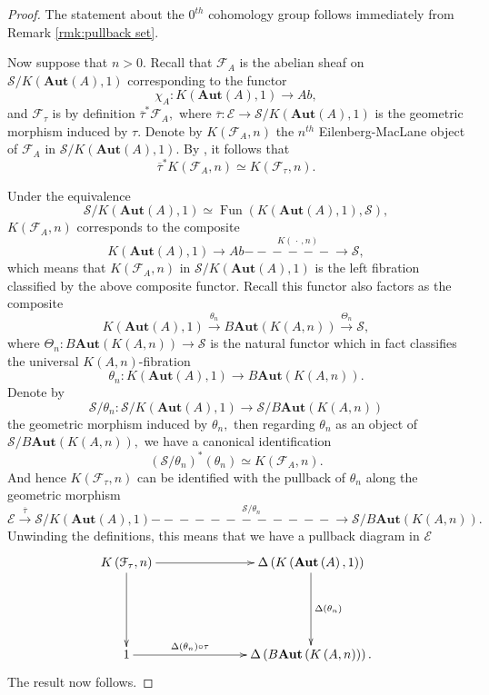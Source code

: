 \documentclass[12pt]{amsart}
\theoremstyle{definition}
\newcommand{\cE}{\mathcal{E}}
\newcommand{\cF}{\mathcal{F}}
\newcommand{\cS}{\mathcal{S}}
\def\Fun{\operatorname{Fun}}
\def\blank{\mspace{3mu}\cdot\mspace{3mu}}
\def\Aut{\mathbf{Aut}}
\def\longlongrightarrow{-\!\!\!-\!\!\!-\!\!\!-\!\!\!-\!\!\!-\!\!\!\longrightarrow}
\def\longlonglongrightarrow{-\!\!\!-\!\!\!-\!\!\!-\!\!\!-\!\!\!-\!\!\!\longlongrightarrow}
\begin{document}
\begin{proof}
The statement about the $0^{th}$ cohomology group follows immediately from Remark \ref{rmk:pullback set}.

Now suppose that $n>0.$ Recall that $\cF_A$ is the abelian sheaf on $\cS/K\left(\Aut\left(A\right),1\right)$ corresponding to the functor $$\chi_A:K\left(\Aut\left(A\right),1\right) \to Ab,$$ and $\cF_{\tau}$ is by definition $\overline{\tau}^*\cF_A,$ where $\overline{\tau}:\cE \to \cS/K\left(\Aut\left(A\right),1\right)$ is the geometric morphism induced by $\tau.$ Denote by $K\left(\cF_A,n\right)$ the $n^{th}$ Eilenberg-MacLane object of $\cF_A$ in $\cS/K\left(\Aut\left(A\right),1\right).$ By \cite[Remark 6.5.1.4]{htt}, it follows that $$\overline{\tau}^*K\left(\cF_A,n\right) \simeq K\left(\cF_{\tau},n\right).$$

Under the equivalence $$\cS/K\left(\Aut\left(A\right),1\right)\simeq \Fun\left(K\left(\Aut\left(A\right),1\right),\cS\right),$$ $K\left(\cF_A,n\right)$ corresponds to the composite $$K\left(\Aut\left(A\right),1\right) \to Ab \stackrel{K\left(\blank,n\right)}{\longlongrightarrow} \cS,$$ which means that $K\left(\cF_A,n\right)$ in $\cS/K\left(\Aut\left(A\right),1\right)$ is the left fibration classified by the above composite functor. Recall this functor also factors as the composite
$$K\left(\Aut\left(A\right),1\right) \stackrel{\theta_n}{\longrightarrow} B\Aut\left(K\left(A,n\right)\right) \stackrel{\Theta_n}{\longrightarrow} \cS,$$ where $\Theta_n:B\Aut\left(K\left(A,n\right)\right) \to \cS$ is the natural functor which in fact classifies the universal $K\left(A,n\right)$-fibration $$\theta_n:K\left(\Aut\left(A\right),1\right) \to B\Aut\left(K\left(A,n\right)\right).$$ Denote by $$\cS/\theta_n:\cS/K\left(\Aut\left(A\right),1\right) \to \cS/B\Aut\left(K\left(A,n\right)\right)$$ the geometric morphism induced by $\theta_n,$ then regarding $\theta_n$ as an object of $\cS/B\Aut\left(K\left(A,n\right)\right),$ we have a canonical identification
$$\left(\cS/\theta_{n}\right)^*\left(\theta_n\right)\simeq K\left(\cF_A,n\right).$$ And hence $K\left(\cF_{\tau},n\right)$ can be identified with the pullback of $\theta_n$ along the geometric morphism $$\cE \stackrel{\overline{\tau}}{\longrightarrow} \cS/K\left(\Aut\left(A\right),1\right) \stackrel{\cS/\theta_n}{\longlonglongrightarrow} \cS/B\Aut\left(K\left(A,n\right)\right).$$ Unwinding the definitions, this means that we have a pullback diagram in $\cE$
$$\xymatrix@C=2.5cm@R=2cm{K\left(\cF_\tau,n\right) \ar[r] \ar[d] & \Delta\left(K\left(\Aut\left(A\right),1\right)\right) \ar[d]^-{\Delta\left(\theta_n\right)} \\
1 \ar[r]^-{\Delta\left(\theta_n\right) \circ \tau} & \Delta\left(B\Aut\left(K\left(A,n\right)\right)\right).}$$ The result now follows.
\end{proof}
\end{document}
